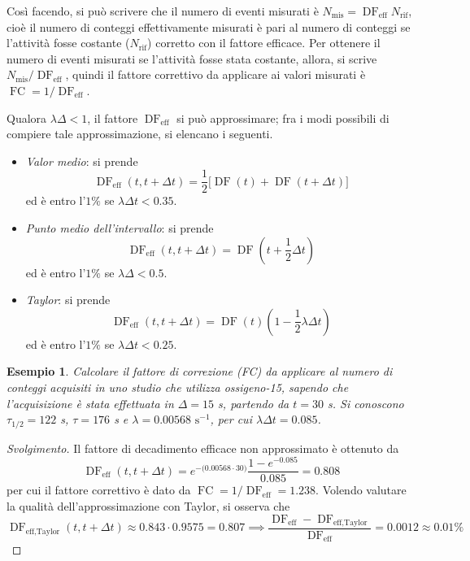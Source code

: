 \documentclass[11pt, a4paper]{scrartcl}
\newenvironment{svolgimento}{\renewcommand\qedsymbol{$\blacksquare$}\begin{proof}[Svolgimento]}{\end{proof}}
\theoremstyle{style}
\newtheorem{esempio}{Esempio}[section]
\theoremstyle{style1}
\numberwithin{equation}{subsection}
\begin{document}
Cos\`i facendo, si pu\`o scrivere che il numero di eventi misurati \`e $N_\text{mis} = \operatorname{DF} _\text{eff} N_\text{rif}$, cio\`e il numero di conteggi effettivamente misurati \`e pari al numero di conteggi se l'attivit\`a fosse costante ($N_\text{rif}$) corretto con il fattore efficace.
Per ottenere il numero di eventi misurati se l'attivit\`a fosse stata costante, allora, si scrive $N_\text{mis}/\operatorname{DF} _\text{eff}$, quindi il fattore correttivo da applicare ai valori misurati \`e $\operatorname{FC}  = 1 / \operatorname{DF} _\text{eff}$.

Qualora $\lambda \Delta < 1$, il fattore $\operatorname{DF} _\text{eff}$ si pu\`o approssimare; fra i modi possibili di compiere tale approssimazione, si elencano i seguenti.
\begin{itemize}
	\item \textit{Valor medio}: si prende 
		\[
			\operatorname{DF} _\text{eff}(t,t+\Delta t) = \frac{1}{2} \big[\operatorname{DF} (t) + \operatorname{DF} (t+\Delta t)\big]
		\] 
		ed \`e entro l'$1\%$ se $\lambda \Delta t < 0.35$.
	\item \textit{Punto medio dell'intervallo}: si prende
		\[
		\operatorname{DF} _\text{eff}(t,t+\Delta t) = \operatorname{DF} \left(t + \frac{1}{2} \Delta t\right) 
		\] 
		ed \`e entro l'$1\%$ se $\lambda \Delta < 0.5$.
	\item \textit{Taylor}: si prende 
		\[
		\operatorname{DF} _\text{eff}(t,t+\Delta t) = \operatorname{DF} (t) \left(1 - \frac{1}{2} \lambda \Delta t\right) 
		\] 
		ed \`e entro l'$1\%$ se $\lambda \Delta t < 0.25$.
\end{itemize}
\begin{esempio}
Calcolare il fattore di correzione (FC) da applicare al numero di conteggi acquisiti in uno studio che utilizza ossigeno-15, sapendo che l'acquisizione \`e stata effettuata in $\Delta  = 15$ s, partendo da $t=30$ s.
Si conoscono $\tau _{1 / 2} = 122$ s, $\tau = 176$ s e $\lambda = 0.00568 \text{ s}^{-1}$, per cui $\lambda \Delta t = 0.085$.
\end{esempio}
\begin{svolgimento}
Il fattore di decadimento efficace non approssimato \`e ottenuto da 
\[
\operatorname{DF} _\text{eff}(t,t+\Delta t) = e^{-\big(0.00568 \cdot 30\big)} \frac{1-e^{-0.085}}{0.085} = 0.808
\] 
per cui il fattore correttivo \`e dato da $\operatorname{FC}  = 1 / \operatorname{DF} _\text{eff} = 1.238$.
Volendo valutare la qualit\`a dell'approssimazione con Taylor, si osserva che 
\[
\operatorname{DF} _\text{eff,Taylor}(t,t+\Delta t)\approx 0.843 \cdot 0.9575 = 0.807 \implies \frac{\operatorname{DF} _\text{eff} - \operatorname{DF} _\text{eff,Taylor}}{\operatorname{DF} _\text{eff}} = 0.0012\approx 0.01\%	
\] 
\end{svolgimento}
\end{document}

